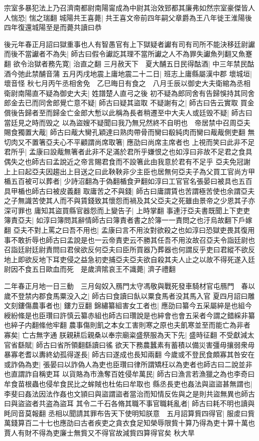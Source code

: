 宗室多暴犯法上乃召濟南都尉南陽甯成為中尉其治效郅都其廉弗如然宗室豪傑皆人人惴恐|{
	惴之瑞翻}
城陽共王喜薨|{
	共王喜文帝前四年嗣父章爵為王八年徙王淮陽後四年復還城陽至是而薨共讀曰恭}


後元年春正月詔曰獄重事也人有智愚官有上下獄疑者讞有司有司所不能決移廷尉讞而後不當讞者不為失|{
	師古曰假令讞訖其理不當所讞之人不為罪失讞魚列翻又魚蹇翻}
欲令治獄者務先寛|{
	治直之翻}
三月赦天下　夏大酺五日民得酤酒|{
	中三年禁民酤酒今弛此禁酺音蒲}
五月丙戌地震上庸地震二十二日|{
	班志上庸縣屬漢中郡}
壞城垣|{
	壞音怪}
秋七月丙午丞相舍免　乙巳晦日有食之　八月壬辰以御史大夫衛綰為丞相衛尉南陽直不疑為御史大夫|{
	姓譜楚人直弓之後}
初不疑為郎同舍有告歸悞持其同舍郎金去已而同舍郎覺亡意不疑|{
	師古曰疑其盜取}
不疑謝有之|{
	師古曰告云實取}
買金償後告歸者至而歸金亡金郎大慙以此稱為長者稍遷至中大夫人或廷毁不疑|{
	師古曰當廷見之時而毁之}
以為盜嫂不疑聞曰我乃無兄然終不自明也　帝居禁中召周亞夫賜食獨置大胾|{
	師古曰胾大臠孔穎達曰熟肉帶骨而臠曰殽純肉而臠曰胾胾側吏翻}
無切肉又不置箸亞夫心不平顧謂尚席取箸|{
	應劭曰尚席主席者也}
上視而笑曰此非不足君所乎|{
	孟康曰設胾無箸者此非不足滿於君所乎嫌恨之也如淳曰非故不足君之食具偶失之也師古曰孟說近之帝言賜君食而不設箸此由我意於君有不足乎}
亞夫免冠謝上上曰起亞夫因趨出上目送之曰此鞅鞅非少主臣也居無何亞夫子為父買工官尚方甲楯五百被可以葬者|{
	少詩沼翻為于偽翻楯食尹翻如淳曰工官官名張晏曰被具也五百具甲楯也師古曰被皮義翻}
取庸苦之不與錢|{
	師古曰庸謂賃也苦謂極苦使也余謂亞夫之子無識苦使其人而不與賃錢致其懷怨而禍及其父亞夫之死雖由景帝之少恩其子亦深可罪也}
庸知其盜買縣官器怨而上變告子|{
	上時掌翻}
事連汙亞夫書既聞上下吏吏簿責亞夫|{
	如淳曰簿問其辭情師古曰簿責者書之於簿一一責問之也汙烏故翻下戶嫁翻}
亞夫不對上罵之曰吾不用也|{
	孟康曰言不用汝對欲殺之也如淳曰恐獄吏畏其復用事不敢折辱也師古曰孟說是也一云帝責吏云不勝其任吾不用汝故召亞夫令詣廷尉也}
召詣廷尉廷尉責問曰君侯欲反何亞夫曰臣所買器乃葬器也何謂反乎吏曰君縱不欲反地上即欲反地下耳吏侵之益急初吏捕亞夫亞夫欲自殺其夫人止之以故不得死遂入廷尉因不食五日歐血而死　是歲濟隂哀王不識薨|{
	濟子禮翻}


二年春正月地一日三動　三月匈奴入鴈門太守馮敬與戰死發車騎材官屯鴈門　春以歲不登禁内郡食馬粟没入之|{
	師古曰食讀曰飤以粟食馬者没其馬入官}
夏四月詔曰雕文刻鏤傷農事者也|{
	鏤力豆翻}
錦繡纂組害女工者也|{
	應劭曰纂今五采屬綷是也組今綬紛絛是也臣瓚曰許慎云纂赤組也師古曰瓚說是也綷會也會五采者今謂之錯綵非纂也綷子内翻絛他牢翻}
農事傷則飢之本女工害則寒之原也夫飢寒並至而能亡為非者寡矣|{
	亡古無字通}
朕親耕后親桑以奉宗廟粢盛祭服為天下先|{
	盛時征翻}
不受獻減太官省繇賦|{
	師古曰省所領翻繇讀曰徭}
欲天下務農蠶素有蓄積以備災害彊毋攘弱衆毋暴寡老耆以夀終幼孤得遂長|{
	師古曰遂成也長知兩翻}
今歲或不登民食頗寡其咎安在或詐偽為吏|{
	張晏曰以詐偽人為吏也臣瓚曰律所謂矯枉以為吏者也師古曰二說並非也直謂詐自稱吏耳}
以貨賂為市漁奪百姓侵牟萬民|{
	師古曰漁言若漁獵之為也李奇曰牟食苗根蟲也侵牟食民比之蛑賊也杜佑曰牟取也}
縣丞長吏也姦法與盜盜甚無謂也|{
	李斐曰姦法因法作姦也文頴曰與盜謂盜者當治而知情反佐與之是則共盜無異也師古曰與盜盜者共盗為盜耳}
其令二千石各脩其職不事官職耗亂者|{
	師古曰耗不明也讀與眊同音莫報翻}
丞相以聞請其罪布告天下使明知朕意　五月詔算貲四得官|{
	服䖍曰貲萬錢算百二十七也應劭曰古者疾吏之貪衣食足知榮辱限貲十算乃得為吏十算十萬也賈人有財不得為吏廉士無貲又不得官故減貲四算得官矣}
秋大旱

